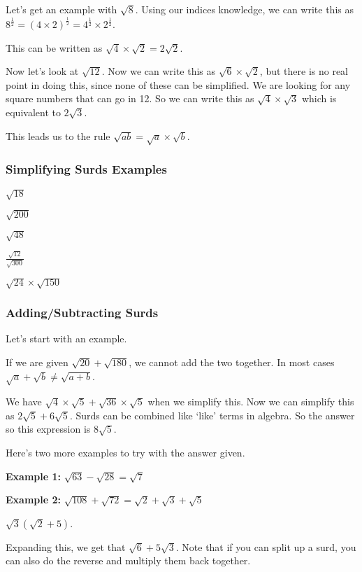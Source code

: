 \documentclass[../maths.tex]{subfiles}
\begin{document}
Let's get an example with $\sqrt{8}$. Using our indices knowledge, we can write this as $8^{\frac{1}{2}}=(4\times 2)^{\frac{1}{2}}=4^{\frac{1}{2}}\times 2^{\frac{1}{2}}$.

This can be written as $\sqrt{4}\times \sqrt{2}=2\sqrt{2}$.

Now let's look at $\sqrt{12}$. Now we can write this as $\sqrt{6}\times \sqrt{2}$, but there is no real point in doing this, since none of these can be simplified.
We are looking for any square numbers that can go in 12. So we can write this as $\sqrt{4}\times \sqrt{3}$ which is equivalent to $2\sqrt{3}$.

This leads us to the rule $\sqrt{ab}=\sqrt{a}\times \sqrt{b}$.
\subsubsection*{Simplifying Surds Examples}
\ex $\sqrt{18}$

\ex $\sqrt{200}$

\ex $\sqrt{48}$

\ex $\frac{\sqrt{12}}{\sqrt{300}}$

\ex $\sqrt{24}\times \sqrt{150}$

\subsubsection*{Adding/Subtracting Surds}
Let's start with an example.

If we are given $\sqrt{20}+\sqrt{180}$, we cannot add the two together. In most cases $\sqrt{a}+\sqrt{b}\neq \sqrt{a+b}$.

We have $\sqrt{4}\times \sqrt{5} + \sqrt{36} \times \sqrt{5}$ when we simplify this. Now we can simplify this as $2\sqrt{5}+6\sqrt{5}$. 
Surds can be combined like `like' terms in algebra. So the answer so this expression is $8\sqrt{5}$.

Here's two more examples to try with the answer given.

\textbf{Example 1: } $\sqrt{63}-\sqrt{28}=\sqrt{7}$

\textbf{Example 2: } $\sqrt{108}+\sqrt{72} = \sqrt{2}+\sqrt{3}+\sqrt{5}$

\begin{example}
    $\sqrt{3}(\sqrt{2}+5)$.

    Expanding this, we get that $\sqrt{6}+5\sqrt{3}$. Note that if you can split up a surd, you can also do the reverse and multiply them back together.
\end{example}
\end{document}
